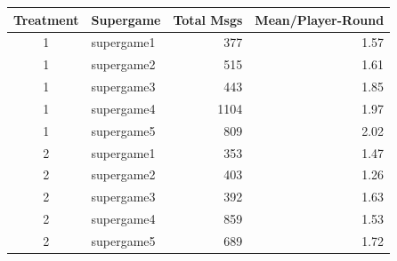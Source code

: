\begin{tabular}{clrr}
  \toprule
  Treatment & Supergame & Total Msgs & Mean/Player-Round \\ 
  \midrule
  1 & supergame1 & 377 & 1.57 \\ 
  1 & supergame2 & 515 & 1.61 \\ 
  1 & supergame3 & 443 & 1.85 \\ 
  1 & supergame4 & 1104 & 1.97 \\ 
  1 & supergame5 & 809 & 2.02 \\ 
  2 & supergame1 & 353 & 1.47 \\ 
  2 & supergame2 & 403 & 1.26 \\ 
  2 & supergame3 & 392 & 1.63 \\ 
  2 & supergame4 & 859 & 1.53 \\ 
  2 & supergame5 & 689 & 1.72 \\ 
  \bottomrule
\end{tabular}
